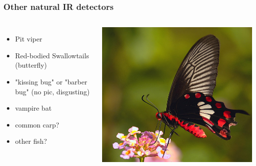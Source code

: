 \documentclass[14pt]{beamer}
\begin{document}
\begin{frame}
\frametitle{Other natural IR detectors}
\begin{columns}
\begin{itemize}
\item Pit viper 
\item Red-bodied Swallowtails (butterfly)
\item "kissing bug" or "barber bug" (no pic, disgusting)
\item vampire bat
\item common carp?
\item other fish?
\end{itemize}
\includegraphics[width=\textwidth]{2005-common-rose.jpg}
\end{columns}
\end{frame}

\end{document}
